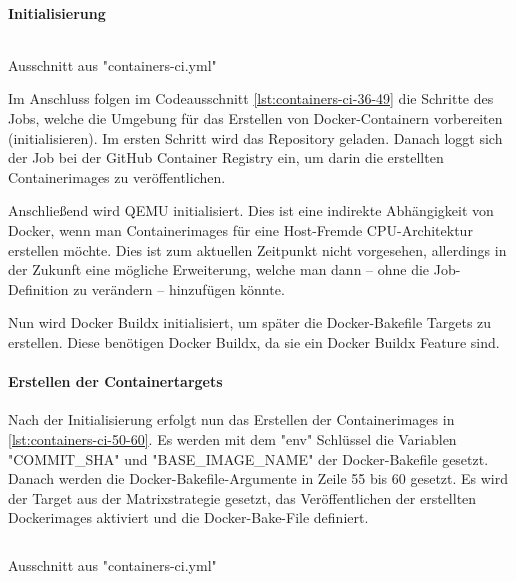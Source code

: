 \paragraph{Initialisierung}

\begin{listing}[H]
    \inputminted[firstline=36,lastline=49]{yaml}{./code-examples/containers-ci.yml}
    \caption{Ausschnitt aus "containers-ci.yml"}
    \label{lst:containers-ci-36-49}
\end{listing}

Im Anschluss folgen im Codeausschnitt \cref{lst:containers-ci-36-49} die Schritte des Jobs, welche die Umgebung für das Erstellen von Docker-Containern vorbereiten (initialisieren). Im ersten Schritt wird das Repository geladen. Danach loggt sich der Job bei der GitHub Container Registry ein, um darin die erstellten Containerimages zu veröffentlichen. 

Anschließend wird QEMU initialisiert. Dies ist eine indirekte Abhängigkeit von Docker, wenn man Containerimages für eine Host-Fremde CPU-Architektur erstellen möchte. Dies ist zum aktuellen Zeitpunkt nicht vorgesehen, allerdings in der Zukunft eine mögliche Erweiterung, welche man dann – ohne die Job-Definition zu verändern – hinzufügen könnte.

Nun wird Docker Buildx initialisiert, um später die Docker-Bakefile Targets zu erstellen. Diese benötigen Docker Buildx, da sie ein Docker Buildx Feature sind. 



\paragraph{Erstellen der Containertargets}

Nach der Initialisierung erfolgt nun das Erstellen der Containerimages in \cref{lst:containers-ci-50-60}. Es werden mit dem "env" Schlüssel die Variablen "COMMIT\_SHA" und "BASE\_IMAGE\_NAME" der Docker-Bakefile gesetzt. Danach werden die Docker-Bakefile-Argumente in Zeile 55 bis 60 gesetzt. Es wird der Target aus der Matrixstrategie gesetzt, das Veröffentlichen der erstellten Dockerimages aktiviert und die Docker-Bake-File definiert.

\begin{listing}[H]
    \inputminted[firstline=50,lastline=60]{yaml}{./code-examples/containers-ci.yml}
    \caption{Ausschnitt aus "containers-ci.yml"}
    \label{lst:containers-ci-50-60}
\end{listing}
\FloatBarrier